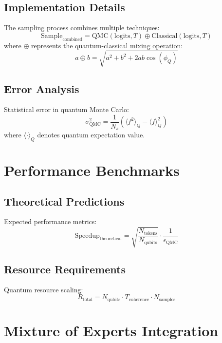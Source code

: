 \documentclass{article}
\begin{document}
\subsection{Implementation Details}
The sampling process combines multiple techniques:
\begin{equation}
\text{Sample}_{\text{combined}} = \text{QMC}(\text{logits}, T) \oplus \text{Classical}(\text{logits}, T)
\end{equation}
where $\oplus$ represents the quantum-classical mixing operation:
\begin{equation}
a \oplus b = \sqrt{a^2 + b^2 + 2ab\cos(\phi_Q)}
\end{equation}

\subsection{Error Analysis}
Statistical error in quantum Monte Carlo:
\begin{equation}
\sigma_{\text{QMC}}^2 = \frac{1}{N_s}\left(\langle f^2\rangle_Q - \langle f\rangle_Q^2\right)
\end{equation}
where $\langle \cdot \rangle_Q$ denotes quantum expectation value.

\section{Performance Benchmarks}

\subsection{Theoretical Predictions}
Expected performance metrics:
\begin{equation}
\text{Speedup}_{\text{theoretical}} = \sqrt{\frac{N_{\text{tokens}}}{N_{\text{qubits}}}} \cdot \frac{1}{\epsilon_{\text{QMC}}}
\end{equation}

\subsection{Resource Requirements}
Quantum resource scaling:
\begin{equation}
R_{\text{total}} = N_{\text{qubits}} \cdot T_{\text{coherence}} \cdot N_{\text{samples}}
\end{equation}

\section{Mixture of Experts Integration}
\end{document}

